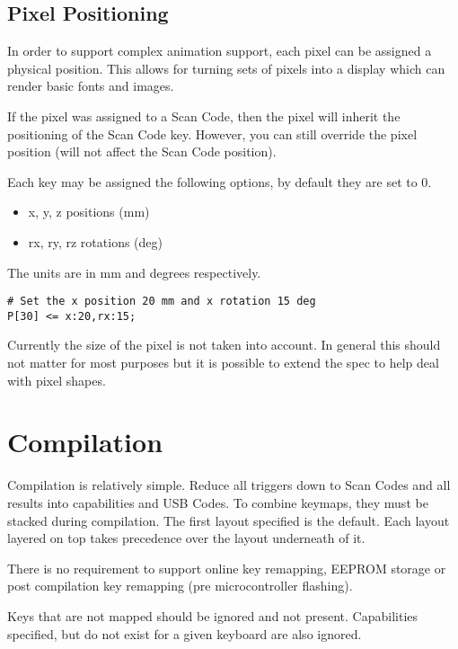 \documentclass{kiibohd-template}
\begin{document}
\section{Pixel Positioning}

In order to support complex animation support, each pixel can be assigned a physical position.
This allows for turning sets of pixels into a display which can render basic fonts and images.

If the pixel was assigned to a Scan Code, then the pixel will inherit the positioning of the Scan Code key.
However, you can still override the pixel position (will not affect the Scan Code position).

Each key may be assigned the following options, by default they are set to 0.

\begin{itemize}
\item x, y, z positions (mm)
\item rx, ry, rz rotations (deg)
\end{itemize}

The units are in mm and degrees respectively.

\begin{lstlisting}
# Set the x position 20 mm and x rotation 15 deg
P[30] <= x:20,rx:15;
\end{lstlisting}

Currently the size of the pixel is not taken into account.
In general this should not matter for most purposes but it is possible to extend the spec to help deal with pixel shapes.


\chapter{Compilation}

Compilation is relatively simple.
Reduce all triggers down to Scan Codes and all results into capabilities and USB Codes.
To combine keymaps, they must be stacked during compilation.
The first layout specified is the default.
Each layout layered on top takes precedence over the layout underneath of it.

There is no requirement to support online key remapping, EEPROM storage or post compilation key remapping (pre microcontroller flashing).

Keys that are not mapped should be ignored and not present.
Capabilities specified, but do not exist for a given keyboard are also ignored.
\end{document}
